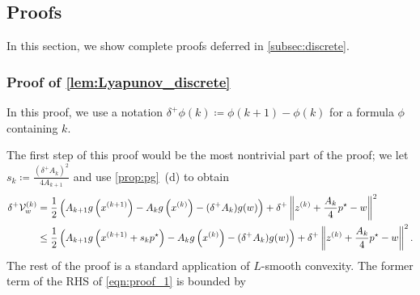\documentclass[11pt,a4paper]{article}
\theoremstyle{definition}
\theoremstyle{plain}
\begin{document}
\subsection{Proofs}\label{sec:proof}
In this section, we show complete proofs deferred in \cref{subsec:discrete}.

\subsubsection{Proof of \texorpdfstring{\cref{lem:Lyapunov_discrete}}{Lemma \ref{lem:Lyapunov_discrete}}}\label{subsec:proof-lem}
In this proof, we use a notation $\delta^+\phi(k) \coloneqq \phi(k + 1) - \phi(k)$ for a formula $\phi$ containing $k$.

The first step of this proof would be the most nontrivial part of the proof; we let $s_k \coloneqq \frac{(\delta^+A_k)^2}{4A_{k + 1}}$ and use \cref{prop:pg}~(d) to obtain
\begin{align}
    \delta^+\mathcal{V}_w^{(k)}
    &= \frac12\left(A_{k + 1}g\left(x^{(k + 1)}\right) - A_kg\left(x^{(k)}\right) - (\delta^+A_k)g(w)\right) + \delta^+\left\|z^{(k)} + \frac{A_k}4p^\star - w\right\|^2\notag\\
    &\le \frac12\left(A_{k + 1}g\left(x^{(k + 1)} + s_kp^\star\right) - A_kg\left(x^{(k)}\right) - (\delta^+A_k)g(w)\right) + \delta^+\left\|z^{(k)} + \frac{A_k}4p^\star - w\right\|^2.\label{eqn:proof_1}
\end{align}
The rest of the proof is a standard application of $L$-smooth convexity.
The former term of the RHS of \eqref{eqn:proof_1} is bounded by
\end{document}
